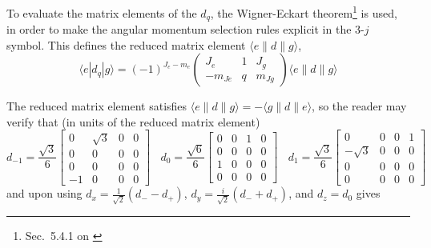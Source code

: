 \documentclass[11pt,letter]{article}
\begin{document}
To evaluate the matrix elements of the $d_{q}$, the Wigner-Eckart
theorem\footnote{Sec.~5.4.1 on \cite{edmonds1996angular}} is used, in order to
make the angular momentum selection rules explicit in the 3-$j$ symbol.  This
defines the reduced matrix element $\langle e \lVert d \rVert g \rangle$,
\begin{equation}
  \langle e | d_{q} | g \rangle = 
      (-1)^{J_{e}-m_{e}} 
      \begin{pmatrix} J_{e} & 1 & J_{g} \\ -m_{Je} & q & m_{Jg} \end{pmatrix}
      \langle e \lVert d \rVert g \rangle
\end{equation}

The reduced matrix element satisfies   $\langle e \lVert d \rVert g \rangle = -
\langle g \lVert d \rVert e \rangle$, so the reader may verify that (in units of the reduced matrix element) 
\begin{equation}
    d_{-1}  = \frac{\sqrt{3}}{6}  
            \left[\begin{smallmatrix}
            0 & \sqrt{3} & 0 & 0\\
            0 & 0 & 0 & 0\\
            0 & 0 & 0 & 0\\
            -1 & 0 & 0 & 0
            \end{smallmatrix}\right] \ \ \ \
    d_{0}  =  \frac{\sqrt{6}}{6}   
              \left[\begin{smallmatrix}
              0 & 0 & 1 & 0\\
              0 & 0 & 0 & 0\\
              1 & 0 & 0 & 0\\
              0 & 0 & 0 & 0
              \end{smallmatrix}\right] \ \ \ \
    d_{1} =   \frac{\sqrt{3}}{6} 
              \left[\begin{smallmatrix}
              0 & 0 & 0 & 1\\
              -\sqrt{3} & 0 & 0 & 0\\
              0 & 0 & 0 & 0\\
              0 & 0 & 0 & 0
              \end{smallmatrix}\right]
\end{equation}
and upon using $d_{x}= \frac{1}{\sqrt{2}}( d_{-} - d_{+} )$,  $d_{y} =
\frac{i}{\sqrt{2}}( d_{-} + d_{+} )$, and $d_{z} = d_{0}$ gives
\end{document}
